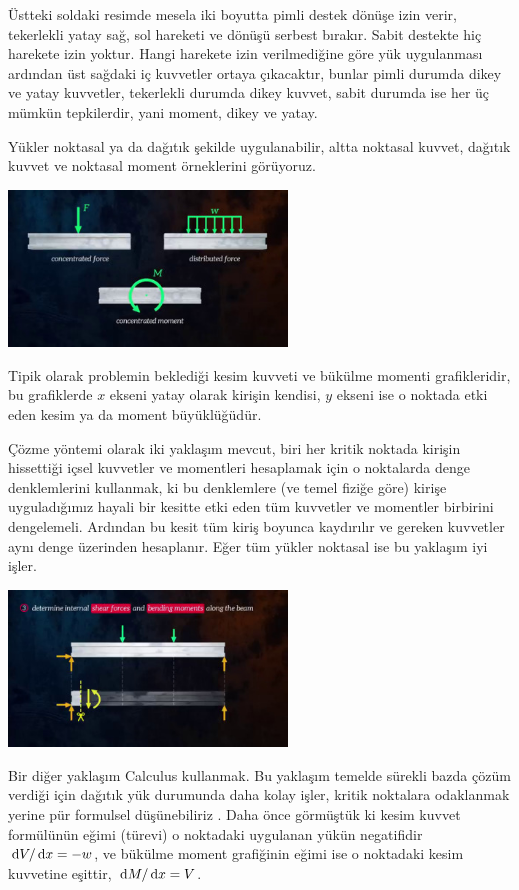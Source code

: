 \documentclass[12pt,fleqn]{article}\usepackage{../../common}
\begin{document}
Üstteki soldaki resimde mesela iki boyutta pimli destek dönüşe izin verir,
tekerlekli yatay sağ, sol hareketi ve dönüşü serbest bırakır. Sabit destekte hiç
harekete izin yoktur. Hangi harekete izin verilmediğine göre yük uygulanması
ardından üst sağdaki iç kuvvetler ortaya çıkacaktır, bunlar pimli durumda dikey
ve yatay kuvvetler, tekerlekli durumda dikey kuvvet, sabit durumda ise her üç
mümkün tepkilerdir, yani moment, dikey ve yatay.

Yükler noktasal ya da dağıtık şekilde uygulanabilir, altta noktasal kuvvet,
dağıtık kuvvet ve noktasal moment örneklerini görüyoruz.

\includegraphics[width=20em]{phy_020_strs_01b_02.jpg}

Tipik olarak problemin beklediği kesim kuvveti ve bükülme momenti grafikleridir,
bu grafiklerde $x$ ekseni yatay olarak kirişin kendisi, $y$ ekseni ise o noktada
etki eden kesim ya da moment büyüklüğüdür.

Çözme yöntemi olarak iki yaklaşım mevcut, biri her kritik noktada kirişin
hissettiği içsel kuvvetler ve momentleri hesaplamak için o noktalarda denge
denklemlerini kullanmak, ki bu denklemlere (ve temel fiziğe göre) kirişe
uyguladığımız hayali bir kesitte etki eden tüm kuvvetler ve momentler birbirini
dengelemeli. Ardından bu kesit tüm kiriş boyunca kaydırılır ve gereken kuvvetler
aynı denge üzerinden hesaplanır. Eğer tüm yükler noktasal ise bu yaklaşım iyi
işler.

\includegraphics[width=20em]{phy_020_strs_01b_03.jpg}

Bir diğer yaklaşım Calculus kullanmak. Bu yaklaşım temelde sürekli bazda çözüm
verdiği için dağıtık yük durumunda daha kolay işler, kritik noktalara odaklanmak
yerine pür formulsel düşünebiliriz . Daha önce görmüştük ki kesim kuvvet
formülünün eğimi (türevi) o noktadaki uygulanan yükün negatifidir
$\,\mathrm{d} V / \,\mathrm{d} x = -w$, ve bükülme moment grafiğinin eğimi ise o noktadaki
kesim kuvvetine eşittir, $\,\mathrm{d} M / \,\mathrm{d} x = V$.
\end{document}
